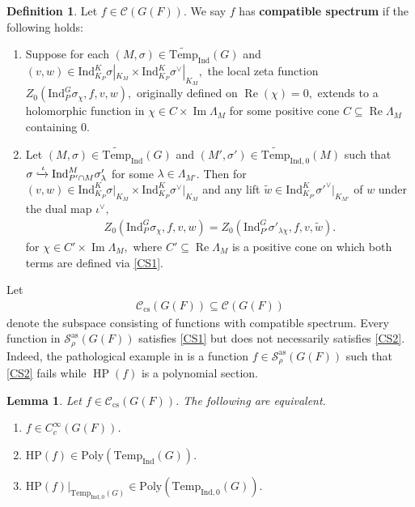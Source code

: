 \documentclass[10pt]{amsart}
\newtheorem{lemma}[theorem]{Lemma}
\theoremstyle{definition}
\newtheorem{definition}[theorem]{Definition}
\numberwithin{equation}{section}
\numberwithin{equation}{subsection}
\newcommand{\Ind}{\mathrm{Ind}}
\newcommand{\Temp}{\mathrm{Temp}}
\renewcommand{\Im}{\mathop{\mathrm{Im}}}
\renewcommand{\Re}{\mathop{\mathrm{Re}}}
\newcommand{\HP}{\mathop{\mathrm{HP}}\nolimits}
\begin{document}
\begin{definition}\label{def:cs}
    Let $f\in \mathcal{C}(G(F)).$ We say $f$ has \textbf{compatible spectrum} if the following holds:
    \begin{enumerate}[label=(CS\arabic*), ref=CS\arabic*]
    \item \label{CS1} Suppose for each $(M,\sigma)\in \widetilde{\mathrm{Temp}}_{\Ind}(G)$ and $(v,w)\in \mathrm{Ind}_{K_P}^K \sigma|_{K_M}\times \mathrm{Ind}_{K_P}^K \sigma^\lor|_{K_M},$  the local zeta function $Z_0(\mathrm{Ind}_P^G\sigma_\chi,f,v,w),$ originally defined on $\Re(\chi)=0,$ extends to a holomorphic function in $\chi\in C\times \Im\Lambda_M$ for some positive cone $C\subseteq \Re\Lambda_M$ containing $0$.
    \item \label{CS2} Let $(M,\sigma)\in\widetilde{\Temp}_\Ind(G)$ and $(M',\sigma')\in\widetilde{\Temp}_{\Ind,0}(M)$ such that $\sigma\xhookrightarrow{\iota} \mathrm{Ind}_{P'\cap M}^{M} \sigma'_{\lambda}$ for some $\lambda\in \Lambda_{M'}$. Then for $(v,w)\in \Ind_{K_P}^K\sigma\vert_{K_M}\times \Ind_{K_P}^K\sigma^\vee\vert_{K_M}$ and any lift $\tilde{w}\in \mathrm{Ind}_{K_{P'}}^{K}\sigma'^\lor|_{K_{M'}}$ of $w$ under the dual map $\iota^\lor,$
    \begin{align*}
            Z_0(\mathrm{Ind}_P^G \sigma_\chi, f,v,w)=Z_0(\mathrm{Ind}_{P'}^G \sigma'_{\lambda\chi}, f,v,\tilde{w}).
    \end{align*}
    for $\chi\in C'\times \Im\Lambda_{M},$ where $C'\subseteq \Re\Lambda_{M}$ is a positive cone on which both terms are defined via \eqref{CS1}.
    \end{enumerate}
\end{definition}
Let
\begin{align*}
    \mathcal{C}_{\mathrm{cs}}(G(F)) \subseteq\mathcal{C}(G(F))
\end{align*}
denote the subspace consisting of functions with compatible spectrum.  Every function in $\mathcal{S}_{\rho}^{\mathrm{as}}(G(F))$ satisfies \eqref{CS1} but does not necessarily satisfies \eqref{CS2}. Indeed, the pathological example in \cite[Example 6.2]{DRS} is a function $f\in \mathcal{S}_{\rho}^{\mathrm{as}}(G(F))$ such that \eqref{CS2} fails while $\HP(f)$ is a polynomial section.




\begin{lemma}\label{lem:comp+poly} Let $f\in \mathcal{C}_{\mathrm{cs}}(G(F))$. The following are equivalent.
\begin{enumerate}
    \item $f\in C^\infty_c(G(F))$.
    \item $\mathrm{HP}(f)\in \mathrm{Poly}(\Temp_{\Ind}(G)).$
    \item $\mathrm{HP}(f)\vert_{\Temp_{\Ind,0}(G)}\in  \mathrm{Poly}(\Temp_{\Ind,0}(G)).$
\end{enumerate}
\end{lemma}
\end{document}
